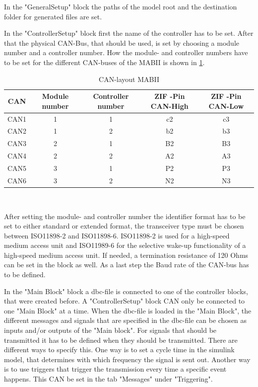 \documentclass[ExampleMasters.tex]{subfiles}
\begin{document}
In the "GeneralSetup" block the paths of the model root and the destination folder for generated files are set. 

In the "ControllerSetup" block first the name of the controller has to be set. After that the physical CAN-Bus, that should be used, is set by choosing a module number and a controller number. How the module- and controller numbers have to be set for the different CAN-buses of the \gls{MABII} is shown in \ref{tab:CAN-layout}.
\begin{table}[h]
	\centering
	\caption{CAN-layout MABII}
	\label{tab:CAN-layout}
	\begin{tabular}{c|c|c|c|c|}
		CAN   & Module number & Controller number & \gls{ZIF} -Pin CAN-High & \gls{ZIF} -Pin \gls{CAN}-Low  \\ \hline
		CAN1     &       1 & 1  & c2 & c3         \\
		CAN2   &      1 & 2  & b2 & b3    \\
		CAN3 &      2 & 1 & B2 & B3        \\
		CAN4& 2 & 2 & A2 & A3  \\
		CAN5& 3 & 1 & P2 & P3 \\
		CAN6& 3 & 2 & N2 & N3 \\
	\end{tabular} \\
\end{table}

After setting the module- and controller number the identifier format has to be set to either standard or extended format, the transceiver type must be chosen between ISO11898-2 and ISO11898-6. ISO11898-2 is used for a high-speed medium access unit and ISO11989-6 for the selective wake-up functionality of a high-speed medium access unit. If needed, a termination resistance of 120 Ohms can be set in the block as well. As a last step the Baud rate of the \gls{CAN}-bus has to be defined.


In the "Main Block" block a dbc-file is connected to one of the controller blocks, that were created before. A "ControllerSetup" block \gls{CAN} only be connected to one "Main Block" at a time. When the dbc-file is loaded in the "Main Block", the different messages and signals that are specified in the dbc-file can be chosen as inputs and/or outputs of the "Main block". For signals that should be transmitted it has to be defined when they should be transmitted. There are different ways to specify this. One way is to set a cycle time in the simulink model, that determines with which frequency the signal is sent out. Another way is to use triggers that trigger the transmission every time a specific event happens. This \gls{CAN} be set in the tab "Messages" under "Triggering".
\end{document}
